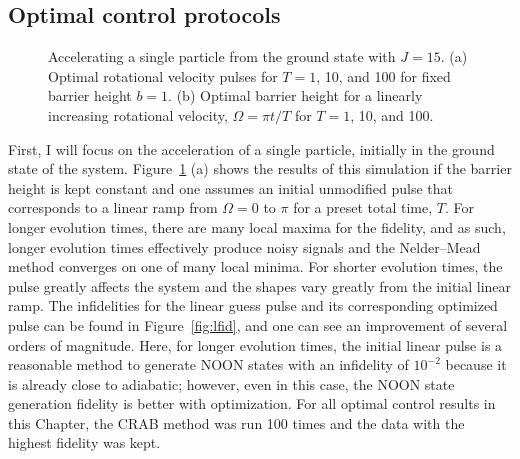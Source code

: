 \subsection{Optimal control protocols}

\begin{figure}
 \centering
 \caption{Accelerating a single particle from the ground state with $J=15$.
 (a) Optimal rotational velocity pulses for $T = 1$, 10, and 100 for fixed barrier height $b=1$.
 (b) Optimal barrier height for a linearly increasing rotational velocity, $\Omega = \pi t/T$ for $T=1$, 10, and 100.}
 \label{fig:pulses}
\end{figure}

First, I will focus on the acceleration of a single particle, initially in the ground state of the system.
Figure~\ref{fig:pulses} (a) shows the results of this simulation if the barrier height is kept constant and one assumes an initial unmodified pulse that corresponds to a linear ramp from $\Omega = 0$ to $\pi$ for a preset total time, $T$.
For longer evolution times, there are many local maxima for the fidelity, and 
as such, longer evolution times effectively produce noisy signals and the Nelder--Mead method converges on one of many local minima.
For shorter evolution times, the pulse greatly affects the system and the shapes vary greatly from the initial linear ramp.
The infidelities for the linear guess pulse and its corresponding optimized pulse can be found in Figure~\ref{fig:lfid}, and one can see an improvement of several orders of magnitude.
Here, for longer evolution times, the initial linear pulse is a reasonable method to generate NOON states with an infidelity of $10^{-2}$ because it is already close to adiabatic; however, even in this case, the NOON state generation fidelity is better with optimization.
For all optimal control results in this Chapter, the CRAB method was run 100 times and the data with the highest fidelity was kept.


